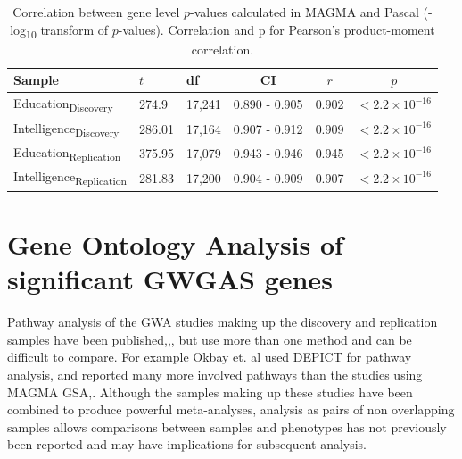 \begin{table}[ht]
    \centering
        \setlength{\extrarowheight}{2pt}
    \begin{tabular}{lllccc}
    \toprule
    Sample & $t$ & df & CI & $r$ & $p$ \\
    \midrule
      Education\textsubscript{Discovery}   & 274.9 & 17,241 & 0.890 - 0.905 & 0.902 & $<2.2 \times 10^{-16}$  \\
       Intelligence\textsubscript{Discovery} &286.01 & 17,164 & 0.907 - 0.912 & 0.909 & $<2.2 \times 10^{-16}$\\
      Education\textsubscript{Replication} & 375.95 & 17,079 & 0.943 - 0.946 & 0.945 & $<2.2 \times 10^{-16}$ \\
       
        Intelligence\textsubscript{Replication} &281.83 & 17,200 & 0.904 - 0.909 & 0.907 &$<2.2 \times 10^{-16}$ \\
        \bottomrule
        \end{tabular}
    \caption[Correlation of gene level scores MAGMA and Pascal]{Correlation between gene level $p$-values calculated in MAGMA and Pascal (-log\textsubscript{10} transform of $p$-values). Correlation and p for Pearson's product-moment correlation. }
    \label{tab:correlation MAGMA and PASCAL}
\end{table}
\clearpage



\section{Gene Ontology Analysis of significant GWGAS genes}
\label{sec:Gene Ontology Analysis of significant GWGAS genes}

Pathway analysis of the GWA studies making up the discovery and replication samples have been published\cite{sniekers2017genome},\cite{okbay2016genome},\cite{hill2019combined}, but use more than one method and can be difficult to compare. For example Okbay et. al\cite{okbay2016genome} used DEPICT for pathway analysis\cite{pers2015biological}, and reported many more involved pathways than the studies using MAGMA GSA\cite{sniekers2017genome},\cite{hill2019combined}. Although the samples making up these studies have been combined to produce powerful meta-analyses, analysis as pairs of non overlapping samples allows comparisons between samples and phenotypes has not previously been reported and may have implications for subsequent analysis.


